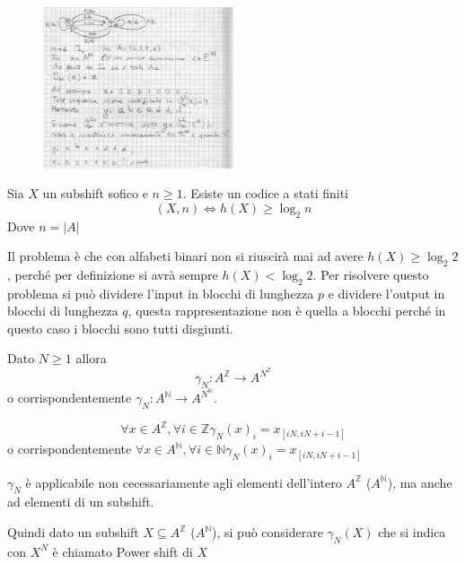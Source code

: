 \begin{esempio}
    \begin{figure}
        \centering
        \includegraphics [width=0.5\textwidth]{img/sistemi_complessi/codici.png}
    \end{figure}
\end{esempio}

\begin{teorema}
    Sia $X$ un subshift sofico e $n\ge 1$. Esiste un codice a stati finiti 
    $$(X,n)\iff h(X)\ge \log_2 n$$
    Dove $n=|A|$
\end{teorema}
Il problema è che con alfabeti binari non si riuscirà mai ad avere $h(X) \ge \log_2 2$,
perché per definizione  si avrà sempre $h(X)< \log_2 2$. Per risolvere questo 
problema si può dividere l'input in blocchi di lunghezza $p$ e dividere l'output
in blocchi di lunghezza $q$, questa rappresentazione non è quella a blocchi perché
in questo caso i blocchi sono tutti disgiunti.

\begin{definizione} 
    Dato $N\ge 1$ allora 
    $$\gamma _N: A^{\mathbb{Z}} \to A^{N^{\mathbb{Z}}} $$
    o corrispondentemente $\gamma _N: A^{\mathbb{N}} \to A^{N^{\mathbb{N}}} $.

    $$\forall x \in A^{\mathbb{Z}}, \forall i \in \mathbb{Z} \gamma_N(x)_i = x_{[iN,iN+i-1]}$$
    o corrispondentemente $\forall x \in A^{\mathbb{N}}, \forall i \in \mathbb{N} \gamma_N(x)_i = x_{[iN,iN+i-1]}$
\end{definizione}

\begin{nota}
    $\gamma_N$ è applicabile non cecessariamente agli elementi dell'intero $A^\mathbb{Z}$ ($A^\mathbb{N}$),
    ma anche ad elementi di un subshift.
\end{nota}

Quindi dato un subshift $X\subseteq A^{\mathbb{Z}}$ ($A^{\mathbb{N}}$), si può
considerare $\gamma_N(X)$ che si indica con $X^N$ è chiamato Power shift di $X$

